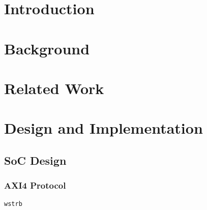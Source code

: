 \documentclass[a4paper,9pt]{report}
\begin{document}
\pagestyle{empty}
\singlespacing

\onehalfspacing

\singlespacing


\setcounter{page}{0}
\pagestyle{plain}
\tableofcontents
\listoffigures
\listoftables

\onehalfspacing


\chapter{Introduction}
\setcounter{page}{1} 


\chapter{Background} 


\chapter{Related Work} 

\chapter{Design and Implementation}





%




\section{SoC Design}

\subsection{AXI4 Protocol}
\texttt{wstrb}
\end{document}
